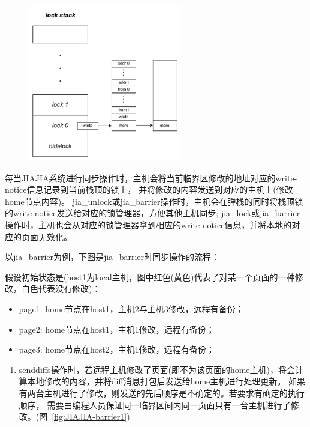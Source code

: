 {    \begin{figure}[!htbp]
        \centering
        \includegraphics[width=0.6\textwidth]{Img/JIAJIA锁栈结构.drawio.pdf}
        \label{fig:JIAJIA-lockstack}
    \end{figure}

    每当JIAJIA系统进行同步操作时，主机会将当前临界区修改的地址对应的write-notice信息记录到当前栈顶的锁上，
    并将修改的内容发送到对应的主机上(修改home节点内容)。
    jia\_unlock或jia\_barrier操作时，主机会在弹栈的同时将栈顶锁的write-notice发送给对应的锁管理器，方便其他主机同步;
    jia\_lock或jia\_barrier操作时，主机也会从对应的锁管理器拿到相应的write-notice信息，并将本地的对应的页面无效化。

    以jia\_barrier为例，下图是jia\_barrier时同步操作的流程：

    假设初始状态是(host1为local主机，图中红色(黄色)代表了对某一个页面的一种修改，白色代表没有修改)：
    \begin{itemize}
        \item page1: home节点在host1，主机2与主机3修改，远程有备份；
        \item page2: home节点在host1，主机1修改，远程有备份；
        \item page3: home节点在host2，主机1修改，远程有备份；
    \end{itemize}
    \begin{enumerate}[label=\arabic*.]

        \item senddiffs操作时，若远程主机修改了页面(即不为该页面的home主机)，将会计算本地修改的内容，并将diff消息打包后发送给home主机进行处理更新。
              如果有两台主机进行了修改，则发送的先后顺序是不确定的。若要求有确定的执行顺序，
              需要由编程人员保证同一临界区间内同一页面只有一台主机进行了修改。(图~\ref{fig:JIAJIA-barrier1})


\end{enumerate}}
